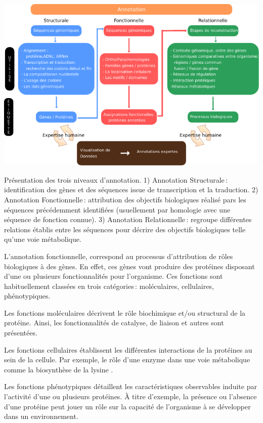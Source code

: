 \begin{refsegment}
    \begin{shadedfigure}[H]
        \centering
        \includegraphics[width=\textwidth]{img/niveaux_annotations.pdf}
        \caption{Présentation des trois niveaux d’annotation. 1) Annotation Structurale : identification des gènes et des séquences issue de transcription et la traduction. 2) Annotation Fonctionnelle : attribution des objectifs biologiques réalisé pars les séquences précédemment identifiées (usuellement par homologie avec une séquence de fonction connue). 3) Annotation Relationnelle : regroupe différentes relations établis entre les séquences pour décrire des objectifs biologiques telle qu'une voie métabolique.  }
        \label{fig:niveaux_annotation}
    \end{shadedfigure}
    
    L’annotation fonctionnelle, correspond au processus d’attribution de rôles biologiques à des gènes. En effet, ces gènes vont produire des protéines disposant d'une ou plusieurs fonctionnalités pour l’organisme. Ces fonctions sont habituellement classées en trois catégories : moléculaires, cellulaires, phénotypiques.
    
    Les fonctions moléculaires décrivent le rôle biochimique et/ou structural de la protéine. Ainsi, les fonctionnalités de catalyse, de liaison et autres sont présentées.
    
    Les fonctions cellulaires établissent les différentes interactions de la protéines au sein de la cellule. Par exemple, le rôle d’une enzyme dans une voie métabolique comme la biosynthèse de la lysine . 
    
    Les fonctions phénotypiques détaillent les caractéristiques observables induite par l’activité d’une ou plusieurs protéines. À titre d’exemple, la présence ou l’absence d’une protéine peut jouer un rôle sur la capacité de l’organisme à se développer dans un environnement.
    

\end{refsegment}
